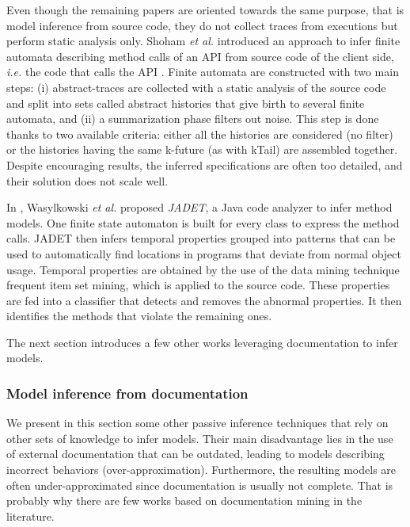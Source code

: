 Even though the remaining papers are oriented towards the same
purpose, that is model inference from source code, they do not
collect traces from executions but perform static analysis only.
Shoham \emph{et al.} introduced an approach to infer finite automata
describing method calls of an API from source code of the client
side, \emph{i.e.} the code that calls the API
\cite{Shoham:2007:SSM:1273463.1273487}. Finite automata are
constructed with two main steps: (i) abstract-traces are
collected with a static analysis of the source code and split
into sets called abstract histories that give birth to several
finite automata, and (ii) a summarization phase filters out
noise. This step is done thanks to two available criteria: either
all the histories are considered (no filter) or the histories
having the same k-future (as with kTail) are assembled together.
Despite encouraging results, the inferred specifications are
often too detailed, and their solution does not scale well.

In \cite{Wasylkowski07detectingobject}, Wasylkowski \emph{et al.}
proposed \textit{JADET}, a Java code analyzer to infer method
models. One finite state automaton is built for every class to
express the method calls. JADET then infers temporal properties
grouped into patterns that can be used to automatically find
locations in programs that deviate from normal object usage.
Temporal properties are obtained by the use of the data mining
technique frequent item set mining, which is applied to the source
code. These properties are fed into a classifier that detects and
removes the abnormal properties. It then identifies the methods
that violate the remaining ones.

The next section introduces a few other works leveraging
documentation to infer models.

\subsubsection{Model inference from documentation}
\label{sec:passive-others}

We present in this section some other passive inference
techniques that rely on other sets of knowledge to infer models.
Their main disadvantage lies in the use of external documentation
that can be outdated, leading to models describing incorrect
behaviors (over-approximation). Furthermore, the resulting models
are often under-approximated since documentation is usually not
complete. That is probably why there are few works based on
documentation mining in the literature.

